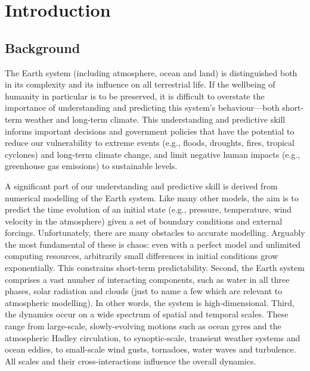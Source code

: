 \documentclass[titlepage]{article}
\begin{document}
\newpage
\pagestyle{fancy}
\thispagestyle{fancy}
\section{Introduction}
\subsection{Background}
The Earth system (including atmosphere, ocean and land) is distinguished both
in its complexity and its influence on all terrestrial life. If the wellbeing
of humanity in particular is to be preserved, it is difficult to overstate the
importance of understanding and predicting this system's behaviour---both
short-term weather and long-term climate. This understanding and predictive
skill informs important decisions and government policies that have the
potential to reduce our vulnerability to extreme events (e.g., floods,
droughts, fires, tropical cyclones) and long-term climate change, and limit
negative human impacts (e.g., greenhouse gas emissions) to sustainable levels.

A significant part of our understanding and predictive skill is derived from
numerical modelling of the Earth system. Like many other models, the aim is to
predict the time evolution of an initial state (e.g., pressure, temperature,
wind velocity in the atmosphere) given a set of boundary conditions and
external forcings.
Unfortunately, there are many obstacles to accurate modelling. Arguably the
most fundamental of these is chaos: even with a perfect model and unlimited
computing resources, arbitrarily small differences in initial conditions
grow exponentially. This constrains short-term predictability. Second,
the Earth system comprises a vast number of interacting components, such as
water in all three phases, solar radiation and clouds (just to name a few which
are relevant to atmospheric modelling). In other words, the system is
high-dimensional. Third, the dynamics occur on a wide spectrum of spatial
and temporal scales. These range from large-scale, slowly-evolving motions
such as ocean gyres and the atmospheric Hadley circulation, to synoptic-scale,
transient weather systems and ocean eddies, to
small-scale wind gusts, tornadoes, water waves and turbulence. All scales
and their cross-interactions influence the overall dynamics.
\end{document}
